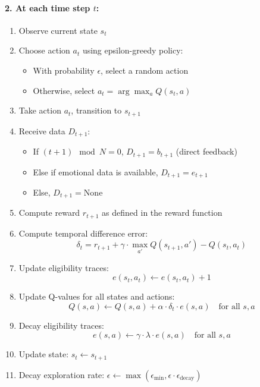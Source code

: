 \paragraph*{2. At each time step $t$:}
\begin{enumerate}
    \item Observe current state $s_t$
    
    \item Choose action $a_t$ using epsilon-greedy policy:
    \begin{itemize}
        \item With probability $\epsilon$, select a random action
        \item Otherwise, select $a_t = \arg\max_a Q(s_t, a)$
    \end{itemize}
    
    \item Take action $a_t$, transition to $s_{t+1}$
    
    \item Receive data $D_{t+1}$:
    \begin{itemize}
        \item If $(t+1) \mod N = 0$, $D_{t+1} = b_{t+1}$ (direct feedback)
        \item Else if emotional data is available, $D_{t+1} = e_{t+1}$
        \item Else, $D_{t+1} = \text{None}$
    \end{itemize}
    
    \item Compute reward $r_{t+1}$ as defined in the reward function
    
    \item Compute temporal difference error:
    \[
    \delta_t = r_{t+1} + \gamma \cdot \max_{a'} Q(s_{t+1}, a') - Q(s_t, a_t)
    \]
    
    \item Update eligibility traces:
    \[
    e(s_t, a_t) \leftarrow e(s_t, a_t) + 1
    \]
    
    \item Update Q-values for all states and actions:
    \[
    Q(s, a) \leftarrow Q(s, a) + \alpha \cdot \delta_t \cdot e(s, a) \quad \text{for all } s, a
    \]
    
    \item Decay eligibility traces:
    \[
    e(s, a) \leftarrow \gamma \cdot \lambda \cdot e(s, a) \quad \text{for all } s, a
    \]
    
    \item Update state: $s_t \leftarrow s_{t+1}$
    
    \item Decay exploration rate: $\epsilon \leftarrow \max(\epsilon_{\text{min}}, \epsilon \cdot \epsilon_{\text{decay}})$
\end{enumerate}


